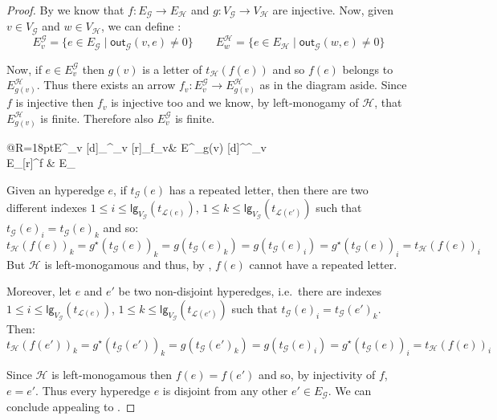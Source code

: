 \documentclass[3p]{elsarticle}
\newcommand{\lgh}{\mathsf{lg}}
\newcommand{\outd}[1]{\mathsf{out}_{\mathcal{#1}}}
\theoremstyle{remark}
\theoremstyle{definition}
\begin{document}
\cnt*
\begin{proof}\label{proof:count}
	By  we know that $f\colon E_{\mathcal{G}}\to E_{\mathcal{H}}$ and $g\colon V_{\mathcal{G}}\to V_\mathcal{H}$ are injective. Now, given $v\in V_{\mathcal{G}}$ and $w\in V_{\mathcal{H}}$, we can define :
	\[E^{\mathcal{G}}_v=\{e\in E_{\mathcal{G}} \mid \outd{G}(v,e) \neq 0\} \qquad E^{\mathcal{H}}_w=\{e\in E_{\mathcal{H}} \mid \outd{G}(w,e) \neq 0\}\]
	
	\noindent 
			\begin{minipage}[r]{.8\linewidth}
					\setlength{\parindent}{1.5em}
		Now, if $e\in E^{\mathcal{G}}_v$ then $g(v)$ is a letter of $t_{\mathcal{H}}(f(e))$ and so $f(e)$ belongs to $E^{\mathcal{H}}_{g(v)}$. Thus there exists an arrow $f_v\colon  E^{\mathcal{G}}_v\to E^{\mathcal{H}}_{g(v)} $ as in the diagram aside. Since $f$ is injective then $f_{v}$ is injective too and we know, by left-monogamy of $\mathcal{H}$, that $E^{\mathcal{H}}_{g(v)}$ is finite. Therefore also $E^{\mathcal{G}}_v$ is finite.
	\end{minipage}
	\hfill 
	\begin{minipage}[r]{.2\linewidth} \vspace{-.3cm}
		\xymatrix@C=40pt@R=18pt{E^{}_v \ar@{>->}[d]_{\iota^{}_v} [r]_{f_v}& E^{}_{g(v)} \ar@{>->}[d]^{\iota^{}_v} \\ E_{}\ar@{>->}[r]^{f} & E_{}}
	\end{minipage}

	Given an hyperedge $e$, if $t_{\mathcal{G}}(e)$ has a repeated letter, then there are two different indexes $1\leq i \leq \lgh_{V_{\mathcal{G}}}(t_{\mathcal{L}(e)})$, $1\leq k \leq \lgh_{V_{\mathcal{G}}}(t_{\mathcal{L}(e')}) $ such that $t_{\mathcal{G}}(e)_i=t_{\mathcal{G}}(e)_k$ and so:
\[t_{\mathcal{H}}(f(e))_k=g^\star(t_{\mathcal{G}}(e))_k=g(t_{\mathcal{G}}(e)_k)=g(t_{\mathcal{G}}(e)_i)=g^\star(t_{\mathcal{G}}(e))_i=t_{\mathcal{H}}(f(e))_i \]
But $\mathcal{H}$ is left-monogamous and thus, by , $f(e)$ cannot have a repeated letter.

	Moreover, let $e$ and $e'$ be two non-disjoint hyperedges, i.e.~there are indexes $1\leq i \leq \lgh_{V_{\mathcal{G}}}(t_{\mathcal{L}(e)})$, $1\leq k \leq \lgh_{V_{\mathcal{G}}}(t_{\mathcal{L}(e')}) $ such that $t_{\mathcal{G}}(e)_i=t_{\mathcal{G}}(e') _k$. Then:
\[t_{\mathcal{H}}(f(e'))_k=g^\star(t_{\mathcal{G}}(e'))_k=g(t_{\mathcal{G}}(e')_k)=g(t_{\mathcal{G}}(e)_i)=g^\star(t_{\mathcal{G}}(e))_i=t_{\mathcal{H}}(f(e))_i \]

	Since $\mathcal{H}$ is left-monogamous then $f(e)=f(e')$ and so, by injectivity of $f$, $e = e'$. Thus every hyperedge $e$ is disjoint from any other $e'\in E_{\mathcal{G}}$. We can conclude appealing to .
\end{proof}
\end{document}
